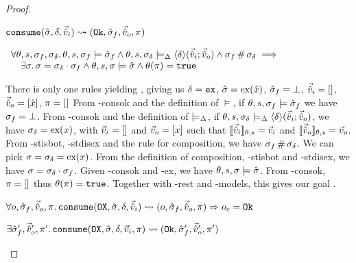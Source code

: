 \begin{proof}

\pfassume \begin{hypvlist}
 $\texttt{consume}(\hat{\sigma},\delta,\vec{\hat{v}}_i)\rightsquigarrow (\texttt{Ok},\hat{\sigma}_f,\vec{\hat{v}}_o,\pi)$
\end{hypvlist}
\pfprove \begin{goalvlist}
 $\begin{array}{l}
\forall \theta,s,\sigma_f,\sigma_\delta\ldotp \theta,s,\sigma_f\models \hat{\sigma}_f \land \theta, s, \sigma_\delta \models_{\Delta} \left<\delta\right>\!(\vec{\hat{v}}_i;\vec{\hat{v}}_o) \land \sigma_f\operatorname{\#}\sigma_\delta \implies \\
\quad \exists \sigma\ldotp \sigma = \sigma_\delta \cdot \sigma_f \land \theta,s,\sigma\models \hat{\sigma} \land \theta(\pi)=\texttt{true}
\end{array}$
\end{goalvlist}
\begin{hypvlist}
 There is only one \consume{} rules yielding \Ok, giving us $\delta=\texttt{ex}$, $\hat{\sigma}=\text{ex}(\hat{x})$, $\hat{\sigma}_f=\bot$, $\vec{\hat{v}}_i=[]$, $\vec{\hat{v}}_o=[\hat{x}]$, $\pi=[]$
 From \hyp{consok} and the definition of $\models$, if $\theta,s,\sigma_f\models\hat{\sigma}_f$ we have $\sigma_f=\bot$.
 From \hyp{consok} and the definition of $\models_{\Delta}$, if $\theta,s,\sigma_\delta\models_{\Delta}\left<\delta\right>\!(\vec{\hat{v}}_i;\vec{\hat{v}}_o)$, we have $\sigma_\delta=\text{ex}(x)$, with $\vec{v}_i=[]$ and $\vec{v}_o=[x]$ such that $\llbracket\vec{\hat{v}}_i\rrbracket_{\theta,s}=\vec{v}_i$ and $\llbracket\vec{\hat{v}}_o\rrbracket_{\theta,s}=\vec{v}_o$.
 From \hyp{stisbot}, \hyp{stdisex} and the rule for composition, we have $\sigma_f\operatorname{\#}\sigma_\delta$.
 We can pick $\sigma=\sigma_\delta=\text{ex}(x)$.
 From the definition of composition, \hyp{stisbot} and \hyp{stdisex}, we have $\sigma=\sigma_\delta\cdot\sigma_f$.
 Given \hyp{consok} and \hyp{ex}, we have $\theta,s,\sigma\models\hat{\sigma}$.
 From \hyp{consok}, $\pi=[]$ thus $\theta(\pi)=\texttt{true}$. Together with \hyp{rest} and \hyp{models}, this gives our goal .
\end{hypvlist}


\pfassume \begin{hypvlist}
 $\forall o, \hat{\sigma}_f,\vec{\hat{v}}_o,\pi \ldotp \texttt{consume}(\texttt{OX},\hat{\sigma},\delta,\vec{\hat{v}}_i)\rightsquigarrow (o, \hat{\sigma}_f, \vec{\hat{v}}_o, \pi)\Rightarrow o_c = \texttt{Ok}$
\end{hypvlist}
\pfprove \begin{goalvlist}
 $\exists  \hat{\sigma}_f',\vec{\hat{v}}_o',\pi' \ldotp \texttt{consume}(\texttt{OX}, \hat{\sigma}, \delta,\vec{v}_i,\pi)\rightsquigarrow (\texttt{Ok}, \hat{\sigma}_f', \vec{\hat{v}}_o', \pi')$
\end{goalvlist}


\end{proof}
